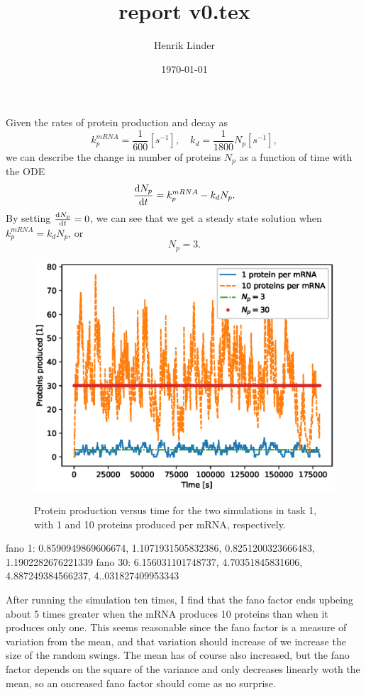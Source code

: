 \documentclass{article}
\title{report v0.tex }
\author{Henrik Linder}
\date{\today}
\begin{document}
\maketitle

Given the rates of protein production and decay as 
\begin{equation}
	k_p^{mRNA} = \frac{1}{600}[s^{-1}],\quad k_d = \frac{1}{1800}N_p[s^{-1}],
\end{equation}
we can describe the change in number of proteins $N_p$ as a function of time with the ODE 
\begin{equation}
	\label{eq:protein_ODE}
	\dv {N_p}{t} = k_p^{mRNA}  - k_dN_p .
\end{equation}
By setting $\dv {N_p}{t} = 0 $, we can see that we get a steady state solution when $k_p^{mRNA} = k_dN_p$, or 
\begin{equation}
	\label{eq:steady_state}
	N_p = 3.
\end{equation}


\begin{figure}[H]
	\centering
\includegraphics[width = \linewidth]{figs/task1_results_v3.eps}
	\label{fig:task1_results}
	\caption{Protein production versus time for the two simulations in task 1, with 1 and 10 proteins produced per mRNA, respectively. }
\end{figure}
fano 1: 0.8590949869606674, 1.1071931505832386, 0.8251200323666483, 1.1902282676221339
fano 30: 6.156031101748737, 4.70351845831606, 4.887249384566237, 4..031827409953343

After running the simulation ten times, I find that the fano factor ends upbeing about 5 times greater when the mRNA produces 10 proteins than when it produces only one. This seems reasonable since the fano factor is a measure of variation from the mean, and that variation should increase of we increase the size of the random swings. The mean has of course also increased, but the fano factor depends on the square of the variance and only decreases linearly woth the mean, so an oncreased fano factor should come as no surprise. 
\end{document}
